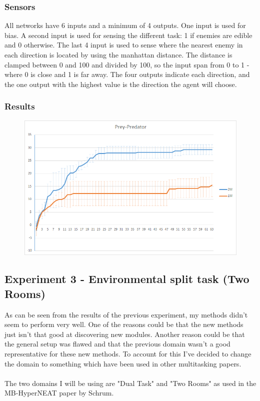 \documentclass[11pt, a4paper]{article}
\begin{document}
\subsubsection{Sensors}
All networks have 6 inputs and a minimum of 4 outputs. One input is used for bias. A second input is used for sensing the different task: 1 if enemies are edible and 0 otherwise. The last 4 input is used to sense where the nearest enemy in each direction is located by using the manhattan distance. The distance is clamped between 0 and 100 and divided by 100, so the input span from 0 to 1 - where 0 is close and 1 is far away. The four outputs indicate each direction, and the one output with the highest value is the direction the agent will choose.
\subsubsection{Results}
\begin{figure}[!ht]
\centering
\includegraphics[scale=0.5]{Results/PreyPredatorResults}
\caption{}
\end{figure}
\subsection{Experiment 3 - Environmental split task (Two Rooms)}
As can be seen from the results of the previous experiment, my methods didn't seem to perform very well. One of the reasons could be that the new methods just isn't that good at discovering new modules. Another reason could be that the general setup was flawed and that the previous domain wasn't a good representative for these new methods. To account for this I've decided to change the domain to something which have been used in other multitasking papers.
\\
\\
The two domains I will be using are "Dual Task" and "Two Rooms" as used in the MB-HyperNEAT paper by Schrum.
\end{document}

